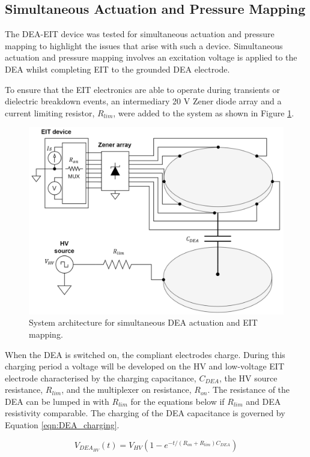 \subsection{Simultaneous Actuation and Pressure Mapping}
The DEA-EIT device was tested for simultaneous actuation and pressure mapping to highlight the issues that arise with such a device. Simultaneous actuation and pressure mapping involves an excitation voltage is applied to the DEA whilst completing EIT to the grounded DEA electrode.

To ensure that the EIT electronics are able to operate during transients or dielectric breakdown events, an intermediary 20 V Zener diode array and a current limiting resistor, $R_{lim}$, were added to the system as shown in Figure \ref{fig:DEA-EIT_protective_ckt}.
\begin{figure}[H]
	\centering
	\includegraphics[width=12cm]{Figures/DEA-EIT_protected_ckt.png}
	\vspace{0.2cm}
	\caption{System architecture for simultaneous DEA actuation and EIT mapping.}
	\label{fig:DEA-EIT_protective_ckt}
\end{figure}
When the DEA is switched on, the compliant electrodes charge. During this charging period a voltage will be developed on the HV and low-voltage EIT electrode characterised by the charging capacitance, $C_{DEA}$, the HV source resistance, $R_{lim}$, and the multiplexer on resistance, $R_{on}$. The resistance of the DEA can be lumped in with $R_{lim}$ for the equations below if $R_{lim}$ and DEA resistivity comparable. The charging of the DEA capacitance is governed by Equation \ref{eqn:DEA_charging}.

\begin{equation}
	V_{\mathit{DEA_{\mathit{HV}}}}(t) = V_{\mathit{HV}} (1 - e^{-t / (R_{on}+R_{\mathit{lim}})C_{\mathit{DEA}}})
	\label{eqn:DEA_charging}
\end{equation}


